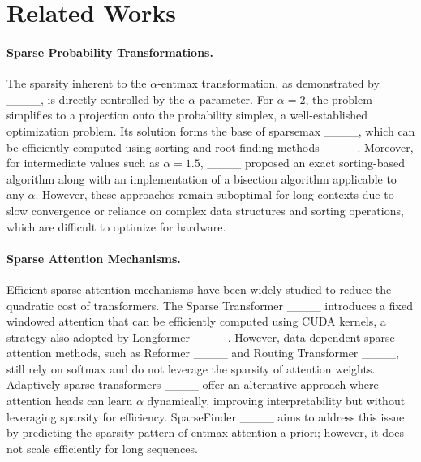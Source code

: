 \section{Related Works}
\paragraph{Sparse Probability Transformations.} 
The sparsity inherent to the $\alpha$-entmax transformation, as demonstrated by ____, is directly controlled by the $\alpha$ parameter. 
For $\alpha = 2$, the problem simplifies to a projection onto the probability simplex, a well-established optimization problem. Its solution forms the base of sparsemax ____, which can be efficiently computed using sorting and root-finding methods ____. 
Moreover, for intermediate values such as $\alpha=1.5$, ____ proposed an exact sorting-based algorithm along with an implementation of a bisection algorithm applicable to any $\alpha$.
However, these approaches remain suboptimal for long contexts due to slow convergence or reliance on complex data structures and sorting operations, which are difficult to optimize for hardware.

\paragraph{Sparse Attention Mechanisms.} Efficient sparse attention mechanisms have been widely studied to reduce the quadratic cost of transformers. The Sparse Transformer ____ introduces a fixed windowed attention that can be efficiently computed using CUDA kernels, a strategy also adopted by Longformer ____. However, data-dependent sparse attention methods, such as Reformer ____ and Routing Transformer ____, still rely on softmax and do not leverage the sparsity of attention weights.
Adaptively sparse transformers ____ offer an alternative approach where attention heads can learn $\alpha$ dynamically, improving interpretability but without leveraging sparsity for efficiency. SparseFinder ____ aims to address this issue by predicting the sparsity pattern of entmax attention a priori; however, it does not scale efficiently for long sequences.


